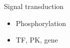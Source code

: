 Signal transduction
\begin{itemize}
    \item Phosphorylation
    \item TF, PK, gene

\end{itemize}
